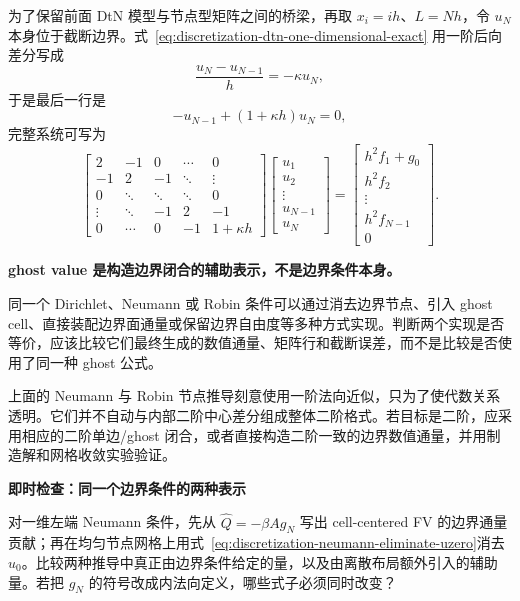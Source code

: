 为了保留前面 DtN 模型与节点型矩阵之间的桥梁，再取 $x_i=ih$、$L=Nh$，令 $u_N$ 本身位于截断边界。式~\eqref{eq:discretization-dtn-one-dimensional-exact} 用一阶后向差分写成
\begin{equation}
\frac{u_N-u_{N-1}}{h}=-\kappa u_N,
\end{equation}
于是最后一行是
\begin{equation}
-u_{N-1}+(1+\kappa h)u_N=0,
\end{equation}
完整系统可写为
\begin{equation}
\boxed{
\begin{bmatrix}
2&-1&0&\cdots&0\\
-1&2&-1&\ddots&\vdots\\
0&\ddots&\ddots&\ddots&0\\
\vdots&\ddots&-1&2&-1\\
0&\cdots&0&-1&1+\kappa h
\end{bmatrix}
\begin{bmatrix}
u_1\\u_2\\\vdots\\u_{N-1}\\u_N
\end{bmatrix}
=
\begin{bmatrix}
h^2f_1+g_0\\h^2f_2\\\vdots\\h^2f_{N-1}\\0
\end{bmatrix}.
}
\label{eq:discretization-dtn-one-dimensional-matrix}
\end{equation}

\begin{warningbox}
\textbf{ghost value 是构造边界闭合的辅助表示，不是边界条件本身。}

同一个 Dirichlet、Neumann 或 Robin 条件可以通过消去边界节点、引入 ghost cell、直接装配边界面通量或保留边界自由度等多种方式实现。判断两个实现是否等价，应该比较它们最终生成的数值通量、矩阵行和截断误差，而不是比较是否使用了同一种 ghost 公式。
\end{warningbox}

上面的 Neumann 与 Robin 节点推导刻意使用一阶法向近似，只为了使代数关系透明。它们并不自动与内部二阶中心差分组成整体二阶格式。若目标是二阶，应采用相应的二阶单边/ghost 闭合，或者直接构造二阶一致的边界数值通量，并用制造解和网格收敛实验验证。

\begin{checkpointbox}
\textbf{即时检查：同一个边界条件的两种表示}

对一维左端 Neumann 条件，先从 $\widehat Q=-\beta A g_N$ 写出 cell-centered FV 的边界通量贡献；再在均匀节点网格上用式~\eqref{eq:discretization-neumann-eliminate-uzero}消去 $u_0$。比较两种推导中真正由边界条件给定的量，以及由离散布局额外引入的辅助量。若把 $g_N$ 的符号改成内法向定义，哪些式子必须同时改变？
\end{checkpointbox}

